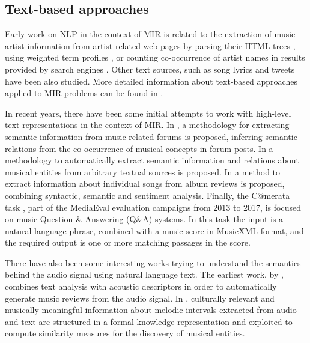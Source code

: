\subsection{Text-based approaches}
\label{sec:SOA:mir:text}

Early work on NLP in the context of MIR is related to the extraction of music artist information from artist-related web pages by parsing their HTML-trees \citep{Cohen2000}, using weighted term profiles \citep{Ellis2002,Whitman2002}, or counting co-occurrence of artist names in results provided by search engines \citep{Schedl2005}. Other text sources, such as song lyrics \citep{laurier2008multimodal,corona2015exploration} and tweets \citep{hauger2013million,schedl2012mining} have been also studied. %
More detailed information about text-based approaches applied to MIR problems can be found in \cite{Knees2013, Schedl2014}.

In recent years, there have been some initial attempts to work with high-level text representations in the context of MIR. In \cite{Sordo2012}, a methodology for extracting semantic information from music-related forums is proposed, inferring semantic relations from the co-occurrence of musical concepts in forum posts. 
In \cite{Knees2011} a methodology to automatically extract semantic information and relations about musical entities from arbitrary textual sources is proposed. In \cite{Tata2010} a method to extract information about individual songs from album reviews is proposed, combining syntactic, semantic and sentiment analysis. Finally, the C@merata task \citep{sutcliffe2016c, sutcliffe2015}, part of the MediaEval evaluation campaigns from 2013 to 2017, is focused on music Question \& Answering (Q\&A) systems. In this task the input is a natural language phrase, combined with a music score in MusicXML format, and the required output is one or more matching passages in the score. 

There have also been some interesting works trying to understand the semantics behind the audio signal using natural language text. The earliest work, by \cite{Whitman2004}, combines text analysis with acoustic descriptors in order to automatically generate music reviews from the audio signal. In \cite{koduri2014culture}, culturally relevant and musically meaningful information about melodic intervals extracted from audio and text are structured in a formal knowledge representation and exploited to compute similarity measures for the discovery of musical entities.


